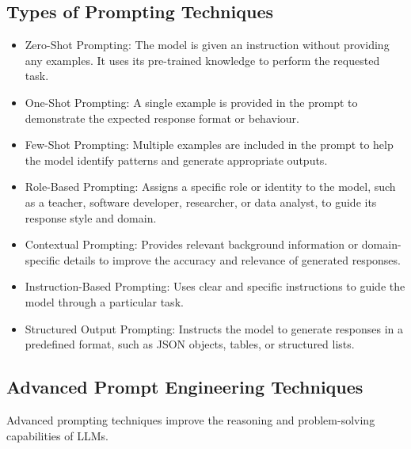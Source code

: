 \subsection{Types of Prompting Techniques}

\begin{itemize}
    \item Zero-Shot Prompting: The model is given an instruction without providing any examples. It uses its pre-trained knowledge to perform the requested task.
    
    \item One-Shot Prompting: A single example is provided in the prompt to demonstrate the expected response format or behaviour.
    
    \item Few-Shot Prompting: Multiple examples are included in the prompt to help the model identify patterns and generate appropriate outputs.
    
    \item Role-Based Prompting: Assigns a specific role or identity to the model, such as a teacher, software developer, researcher, or data analyst, to guide its response style and domain.
    
    \item Contextual Prompting: Provides relevant background information or domain-specific details to improve the accuracy and relevance of generated responses.
    
    \item Instruction-Based Prompting: Uses clear and specific instructions to guide the model through a particular task.
    
    \item Structured Output Prompting: Instructs the model to generate responses in a predefined format, such as JSON objects, tables, or structured lists.
\end{itemize}

\subsection{Advanced Prompt Engineering Techniques}

Advanced prompting techniques improve the reasoning and problem-solving capabilities of LLMs.

